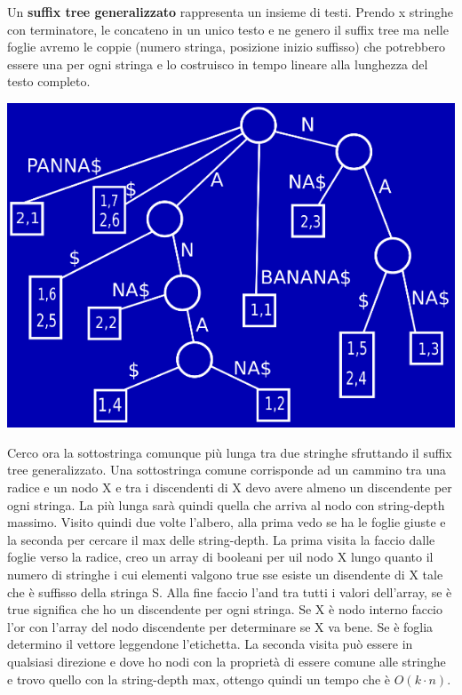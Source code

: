 \documentclass[a4paper,12pt, oneside]{book}
\begin{document}
Un \textbf{suffix tree generalizzato} rappresenta un insieme di
testi. Prendo x stringhe con terminatore, le concateno in un unico
testo e ne genero il suffix tree ma nelle foglie avremo le coppie
(numero stringa, posizione inizio suffisso) che potrebbero essere una
per ogni stringa e lo costruisco in tempo lineare alla lunghezza del
testo completo.
\begin{center}
  \includegraphics[scale = 0.5]{img/suf7.png}
\end{center}
Cerco ora la sottostringa comunque più lunga tra due
stringhe sfruttando il suffix tree generalizzato. Una sottostringa
comune corrisponde ad un cammino tra una radice e un nodo X e tra i
discendenti di X devo avere almeno un discendente  per ogni
stringa. La più lunga sarà quindi quella che arriva al nodo con
string-depth massimo. Visito quindi due volte l'albero, alla prima
vedo se ha le foglie giuste e la seconda per cercare il max delle
string-depth. La prima visita la faccio dalle foglie verso la radice,
creo un array di booleani per uil nodo X lungo quanto il numero di
stringhe i cui elementi valgono true sse esiste un disendente di X tale che è
suffisso della stringa S. Alla fine faccio l'and tra tutti i valori
dell'array, se è true significa che ho un discendente per ogni
stringa. Se X è nodo interno faccio l'or con l'array del nodo
discendente per determinare se X va bene. Se è foglia determino il
vettore leggendone l'etichetta. La seconda visita può essere in
qualsiasi direzione e dove ho nodi con la proprietà di essere comune
alle stringhe e trovo quello con la string-depth max, ottengo quindi
un tempo che è $O(k\cdot n)$.
\end{document}
